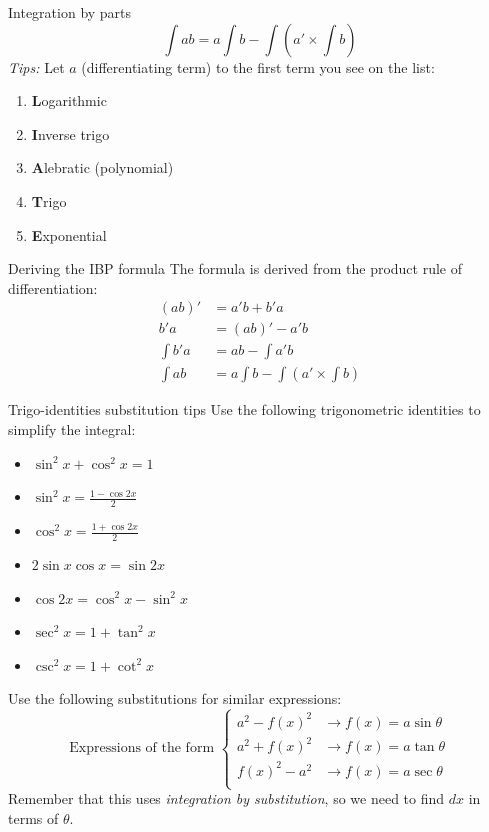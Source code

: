 \documentclass{article}
\begin{document}
\label{sec:intpart}
\begin{theorem}
    {Integration by parts}
    \[\int ab=a\int b-\int (a'\times \int b)\]
    \emph{Tips:}
    Let $a$ (differentiating term) to the first term you see on the list:
    \begin{enumerate}
        \item \textbf{L}ogarithmic
        \item \textbf{I}nverse trigo
        \item \textbf{A}lebratic (polynomial)
        \item \textbf{T}rigo
        \item \textbf{E}xponential
    \end{enumerate}
\end{theorem}
\begin{knBox}
    {Deriving the IBP formula}
    The formula is derived from the product rule of differentiation:
    \begin{align*}
        (ab)'    & = a'b + b'a                     \\
        b'a      & = (ab)' - a'b                   \\
        \int b'a & = ab - \int a'b                 \\
        \int ab  & =a\int b-\int (a'\times \int b)
    \end{align*}
\end{knBox}

\label{sec:inttrigo}
\begin{knBox}
    {Trigo-identities substitution tips}
    Use the following trigonometric identities to simplify the integral:
    \begin{itemize}
        \item $\sin^2x+\cos^2x=1$
        \item $\sin^2x=\frac{1-\cos2x}{2}$
        \item $\cos^2x=\frac{1+\cos2x}{2}$
        \item $2\sin x\cos x=\sin2x$
        \item $\cos2x=\cos^2x-\sin^2x$
        \item $\sec^2x=1+\tan^2x$
        \item $\csc^2x=1+\cot^2x$
    \end{itemize}
    Use the following substitutions for similar expressions:
    \[
        \text{Expressions of the form }
        \begin{cases}
            a^2-f(x)^2 & \to f(x)=a\sin\theta \\
            a^2+f(x)^2 & \to f(x)=a\tan\theta \\
            f(x)^2-a^2 & \to f(x)=a\sec\theta \\
        \end{cases}
    \]
    Remember that this uses \emph{integration by substitution}, so we need to find $dx$ in terms of $\theta$.
\end{knBox}
\end{document}
